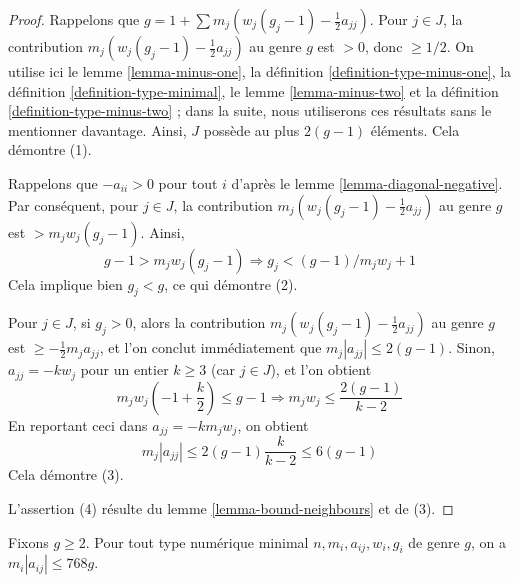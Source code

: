 \begin{proof}
Rappelons que $g = 1 + \sum m_j(w_j(g_j - 1) - \frac{1}{2} a_{jj})$.
Pour $j \in J$, la contribution $m_j(w_j(g_j - 1) - \frac{1}{2} a_{jj})$
au genre $g$ est $> 0$, donc $\geq 1/2$. On utilise ici le
lemme \ref{lemma-minus-one},
la définition \ref{definition-type-minus-one},
la définition \ref{definition-type-minimal},
le lemme \ref{lemma-minus-two} et
la définition \ref{definition-type-minus-two} ; dans la suite, nous utiliserons ces
résultats sans le mentionner davantage.
Ainsi, $J$ possède au plus $2(g - 1)$ éléments.
Cela démontre (1).

\medskip\noindent
Rappelons que $-a_{ii} > 0$ pour tout $i$ d'après le lemme \ref{lemma-diagonal-negative}.
Par conséquent, pour $j \in J$, la contribution $m_j(w_j(g_j - 1) - \frac{1}{2} a_{jj})$
au genre $g$ est $> m_jw_j(g_j - 1)$. Ainsi,
$$
g - 1 > m_jw_j(g_j - 1) \Rightarrow g_j < (g - 1)/m_jw_j + 1
$$
Cela implique bien $g_j < g$, ce qui démontre (2).

\medskip\noindent
Pour $j \in J$, si $g_j > 0$, alors la contribution
$m_j(w_j(g_j - 1) - \frac{1}{2} a_{jj})$ au genre $g$
est $\geq -\frac{1}{2}m_ja_{jj}$, et l'on conclut immédiatement
que $m_j|a_{jj}| \leq 2(g - 1)$. Sinon, $a_{jj} = -kw_j$
pour un entier $k \geq 3$ (car $j \in J$), et l'on obtient
$$
m_jw_j(-1 + \frac{k}{2}) \leq g - 1
\Rightarrow
m_jw_j \leq \frac{2(g - 1)}{k - 2}
$$
En reportant ceci dans $a_{jj} = -km_jw_j$, on obtient
$$
m_j|a_{jj}| \leq 2(g - 1) \frac{k}{k - 2} \leq 6(g - 1)
$$
Cela démontre (3).

\medskip\noindent
L'assertion (4) résulte du lemme \ref{lemma-bound-neighbours} et de (3).
\end{proof}

\begin{lemma}
\label{lemma-bound-wm}
Fixons $g \geq 2$. Pour tout type numérique minimal $n, m_i, a_{ij}, w_i, g_i$
de genre $g$, on a $m_i|a_{ij}| \leq 768g$.
\end{lemma}

